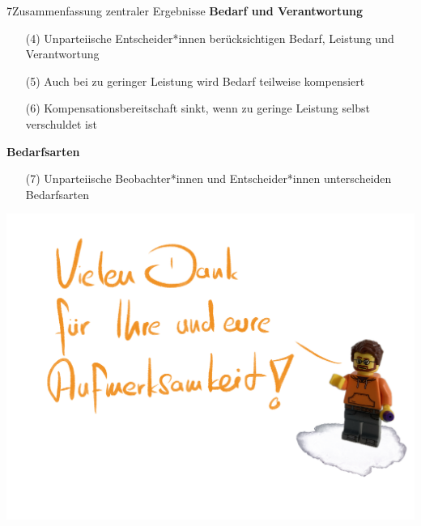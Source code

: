 \documentclass[xcolor=table,9pt,aspectratio=169]{beamer}
\begin{document}
\begin{frame}{\vspace*{10mm}7\hspace*{1em}Zusammenfassung zentraler Ergebnisse}
\textbf{Bedarf und Verantwortung}\\
\medskip
\begin{itemize}
   \item[(4)] Unparteiische Entscheider*innen berücksichtigen Bedarf, Leistung und Verantwortung
   \item[(5)] Auch bei zu geringer Leistung wird Bedarf teilweise kompensiert
   \item[(6)] Kompensationsbereitschaft sinkt, wenn zu geringe Leistung selbst verschuldet ist
\end{itemize}
\vspace{1em}
\textbf{Bedarfsarten}\\
\medskip
\begin{itemize}
   \item[(7)] Unparteiische Beobachter*innen und Entscheider*innen unterscheiden Bedarfsarten
   \end{itemize}
\end{frame}


\begin{frame}{}
\begin{center}
   \includegraphics[width=0.8\linewidth]{figures/slides_thanks.pdf}
\end{center}
\end{frame}
\end{document}
